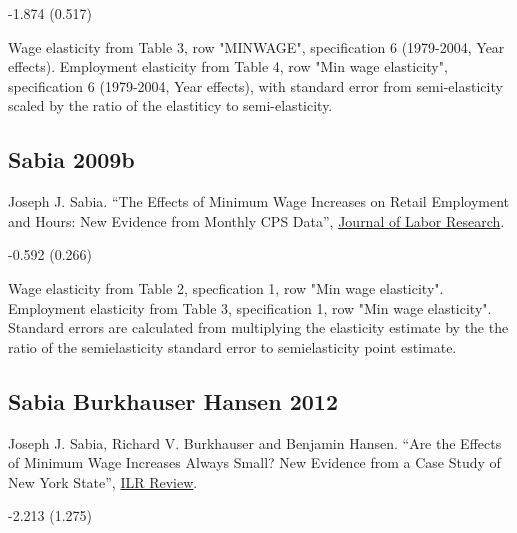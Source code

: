 \vspace{0.7em}

 -1.874 (0.517)

\vspace{0.7em}

 Wage elasticity from Table 3, row "MINWAGE", specification 6 (1979-2004, Year effects). Employment elasticity from Table 4, row "Min wage elasticity", specification 6 (1979-2004, Year effects), with standard error from semi-elasticity scaled by the ratio of the elastiticy to semi-elasticity.

\subsection*{Sabia 2009b}
\vspace{-0.7em}

\noindent Joseph J. Sabia. ``The Effects of Minimum Wage Increases on Retail Employment and Hours: New Evidence from Monthly CPS Data'', \href{https://doi.org/10.1007/s12122-008-9054-1}{Journal of Labor Research}.

\vspace{0.7em}

 -0.592 (0.266)

\vspace{0.7em}

 Wage elasticity from Table 2, specfication 1, row "Min wage elasticity". Employment elasticity from Table 3, specification 1, row "Min wage elasticity". Standard errors are calculated from multiplying the elasticity estimate by the the ratio of the semielasticity standard error to semielasticity point estimate.

\subsection*{Sabia Burkhauser Hansen 2012}
\vspace{-0.7em}

\noindent Joseph J. Sabia, Richard V. Burkhauser and Benjamin Hansen. ``Are the Effects of Minimum Wage Increases Always Small? New Evidence from a Case Study of New York State'', \href{https://doi.org/10.1177/001979391206500207}{ILR Review}.

\vspace{0.7em}

 -2.213 (1.275)

